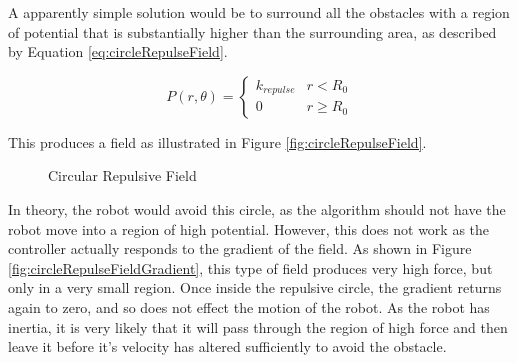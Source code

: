 \documentclass[10pt]{article}
\begin{document}
A apparently simple solution would be to surround all the obstacles with a
region of potential that is substantially higher than the surrounding area, as
described by Equation \ref{eq:circleRepulseField}.

\begin{equation}
P\left(r,\theta\right)=\begin{cases}
k_{repulse} & r<R_{0}\\
0 & r\geq R_{0}
\end{cases}\label{eq:circleRepulseField}
\end{equation}

This produces a field as illustrated in Figure \ref{fig:circleRepulseField}.

\begin{figure}
 \centering
 \caption{Circular Repulsive Field}
\end{figure}

In theory, the robot would avoid this circle, as the algorithm should not have
the robot move into a region of high potential. However, this does not work as
the controller actually responds to the gradient of the field. As shown in
Figure \ref{fig:circleRepulseFieldGradient}, this type of field produces very
high force, but only in a very small region. Once inside the repulsive circle, the
gradient returns again to zero, and so does not effect the motion of the robot.
As the robot has inertia, it is very likely that it will pass through the region
of high force and then leave it before it's velocity has altered sufficiently to
avoid the obstacle.
\end{document}
